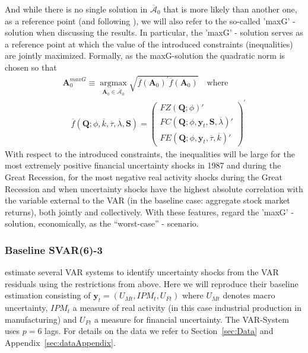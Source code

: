 \documentclass[a4paper,11pt,listof=nochaptergap,oneside,pointednumbers,bibtotoc,bigheadings,liststotoc,hidelinks]{scrbook}
\theoremstyle{mysatz}
\theoremstyle{mydefinition}
\theoremstyle{mytheorem}
\theoremstyle{mybemerkung}
\newcommand{\vect}[1]{\boldsymbol{\mathbf{#1}}}
\begin{document}
And while there is no single solution in $\overline{\vect{\mathcal{A}}}_0$ that is more likely than another one, as a reference point (and following \citealp{ludvigsonetal:18}), we will also refer to the so-called 'maxG' - solution when discussing the results. In particular, the 'maxG' - solution serves as a reference point at which the value of the introduced constraints (inequalities) are jointly maximized. Formally, as the maxG-solution the quadratic norm is chosen so that
\begin{equation} \label{eq:svar_ludvi16}
\begin{split}
\vect{A}_0^{maxG} \equiv \operatorname*{argmax}_{\vect{A}_0 \in \overline{\vect{\mathcal{A}}}_0} \sqrt{\overline{f}(\vect{A}_0)^'\overline{f}(\vect{A}_0)} \quad \text{where} \\
\quad \overline{f}(\vect{Q}; \phi, \overline{k}, \overline{\tau}, \overline{\lambda}, \vect{S}) = \begin{pmatrix}
			FZ(\vect{Q}; \phi)' \\
			FC(\vect{Q}; \phi, \vect{y}_t, \vect{S}, \overline{\lambda})' \\
			FE(\vect{Q}; \phi, \vect{y}_t, \overline{\tau}, \overline{k})'	
		\end{pmatrix}^'
\end{split}								
\end{equation}
With respect to the introduced constraints, the inequalities will be large for the most extremely positive financial uncertainty shocks in 1987 and during the Great Recession, for the most negative real activity shocks during the Great Recession and when uncertainty shocks have the highest absolute correlation with the variable external to the VAR (in the baseline case: aggregate stock market returns), both jointly and collectively. With these features, \citet{ludvigsonetal:18} regard the 'maxG' - solution, economically, as the ``worst-case'' - scenario.

\subsubsection{Baseline SVAR(6)-3}
\citet{ludvigsonetal:18} estimate several VAR systems to identify uncertainty shocks from the VAR residuals using the restrictions from above. Here we will reproduce their baseline estimation consisting of $\vect{y}_t = (U_{Mt}, IPM_{t}, U_{Ft})$ where $U_{Mt}$ denotes macro uncertainty, $IPM_{t}$ a measure of real activity (in this case industrial production in manufacturing) and $U_{Ft}$ a measure for financial uncertainty. The VAR-System uses $p=6$ lags. For details on the data we refer to Section~\ref{sec:Data} and Appendix~\ref{sec:dataAppendix}.
\end{document}
